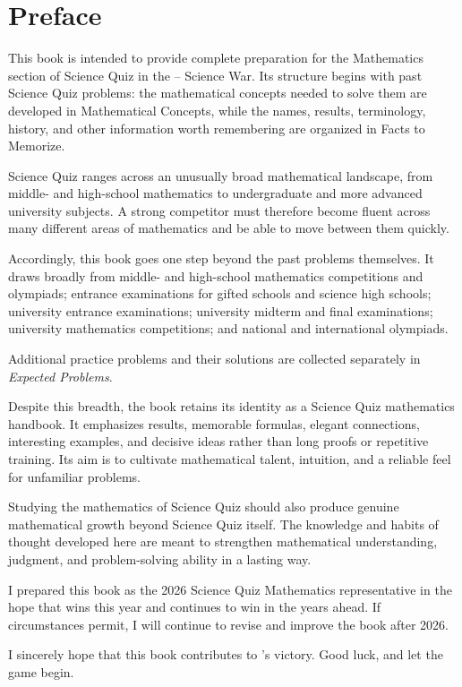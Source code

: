    \chapter*{Preface}

    This book is intended to provide complete preparation for the Mathematics
    section of Science Quiz in the \POSTECH--\KAIST{} Science War. Its structure
    begins with past Science Quiz problems: the mathematical concepts needed to
    solve them are developed in Mathematical Concepts, while the names, results,
    terminology, history, and other information worth remembering are organized
    in Facts to Memorize.

    Science Quiz ranges across an unusually broad mathematical landscape, from
    middle- and high-school mathematics to undergraduate and more advanced
    university subjects. A strong competitor must therefore become fluent across
    many different areas of mathematics and be able to move between them quickly.

    Accordingly, this book goes one step beyond the past problems themselves. It
    draws broadly from middle- and high-school mathematics competitions and
    olympiads; entrance examinations for gifted schools and science high schools;
    university entrance examinations; university midterm and final examinations;
    university mathematics competitions; and national and international
    olympiads.

    Additional practice problems and their solutions are collected separately in
    \emph{Expected Problems}.

    Despite this breadth, the book retains its identity as a Science Quiz
    mathematics handbook. It emphasizes results, memorable formulas, elegant
    connections, interesting examples, and decisive ideas rather than long proofs
    or repetitive training. Its aim is to cultivate mathematical talent,
    intuition, and a reliable feel for unfamiliar problems.

    Studying the mathematics of Science Quiz should also produce genuine
    mathematical growth beyond Science Quiz itself. The knowledge and habits of
    thought developed here are meant to strengthen mathematical understanding,
    judgment, and problem-solving ability in a lasting way.

    I prepared this book as the 2026 Science Quiz Mathematics representative
    in the hope that \POSTECH{} wins this year and continues to win in the years
    ahead. If circumstances permit, I will continue to revise and improve the
    book after 2026.

    I sincerely hope that this book contributes to \POSTECH's victory. Good luck,
    and let the game begin.
